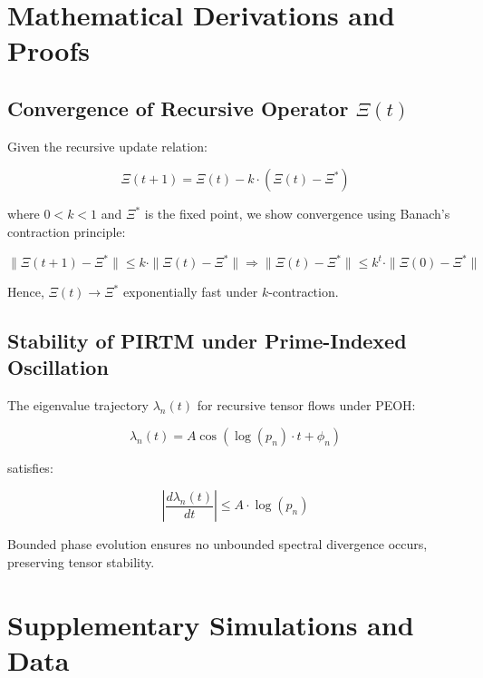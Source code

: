 \documentclass[12pt]{article}
\begin{document}
\nocite{*}






\appendix

\section{Mathematical Derivations and Proofs}

\subsection*{Convergence of Recursive Operator $\Xi(t)$}

Given the recursive update relation:

\begin{equation}
\Xi(t+1) = \Xi(t) - k \cdot (\Xi(t) - \Xi^*)
\end{equation}

where $0 < k < 1$ and $\Xi^*$ is the fixed point, we show convergence using Banach’s contraction principle:

\begin{equation}
\|\Xi(t+1) - \Xi^*\| \leq k \cdot \|\Xi(t) - \Xi^*\| \Rightarrow \|\Xi(t) - \Xi^*\| \leq k^t \cdot \|\Xi(0) - \Xi^*\|
\end{equation}

Hence, $\Xi(t) \to \Xi^*$ exponentially fast under $k$-contraction.

\subsection*{Stability of PIRTM under Prime-Indexed Oscillation}

The eigenvalue trajectory $\lambda_n(t)$ for recursive tensor flows under PEOH:

\begin{equation}
\lambda_n(t) = A \cos(\log(p_n) \cdot t + \phi_n)
\end{equation}

satisfies:

\begin{equation}
\left| \frac{d\lambda_n(t)}{dt} \right| \leq A \cdot \log(p_n)
\end{equation}

Bounded phase evolution ensures no unbounded spectral divergence occurs, preserving tensor stability.

\section{Supplementary Simulations and Data}
\end{document}
